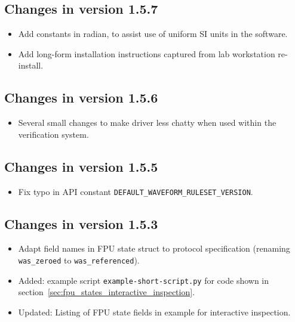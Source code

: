 \documentclass[fontsize=12,a4paper]{scrreprt}
\begin{document}
\subsection*{Changes in version 1.5.7}
\begin{itemize}
\item Add constants in radian, to assist use of uniform SI units in
  the software.
\item Add long-form installation instructions captured from lab
  workstation re-install.
\end{itemize}


\subsection*{Changes in version 1.5.6}
\begin{itemize}
\item Several small changes to make driver less chatty when
  used within the verification system.
\end{itemize}


\subsection*{Changes in version 1.5.5}
\begin{itemize}
\item Fix typo in API constant \texttt{DEFAULT\_WAVEFORM\_RULESET\_VERSION}.
\end{itemize}

\subsection*{Changes in version 1.5.3}

\begin{itemize}
\item Adapt field names in FPU state struct to protocol specification
  (renaming \texttt{was\_zeroed} to \texttt{was\_referenced}).
\item Added: example script \texttt{example-short-script.py} for code shown in
  section~\ref{sec:fpu_states_interactive_inspection}.
\item Updated: Listing of FPU state fields in example for interactive inspection.
\end{itemize}
\end{document}
